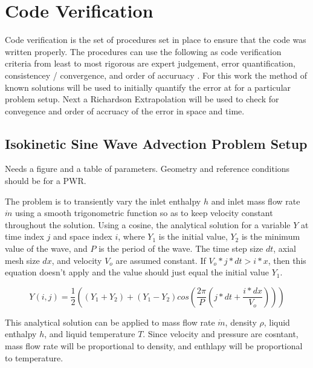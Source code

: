 \documentclass{mc2015}
\begin{document}
\section{Code Verification}

Code verification is the set of procedures set in place to ensure that the code
was written properly. The procedures can use the following as code verification
criteria from least to most rigorous are expert judgement, error quantification,
consistencey / convergence, and order of accuruacy \cite{VV_Book}. For this work
the method of known solutions will be used to initially quantify the error at
for a particular problem setup. Next a Richardson Extrapolation will be used to
check for convegence and order of accruacy of the error in space and time.
 



\subsection{Isokinetic Sine Wave Advection Problem Setup}

Needs a figure and a table of parameters. Geometry and reference conditions
should be for a PWR.

The problem is to transiently vary the inlet enthalpy $h$ and inlet mass flow
rate $\dot{m}$ using a smooth trigonometric function so as to keep velocity
constant throughout the solution. Using a cosine, the analytical solution for a
variable $Y$ at time index $j$ and space index $i$, where $Y_{1}$ is the initial
value, $Y_{2}$ is the minimum value of the wave, and $P$ is the period of the
wave. The time step size $dt$, axial mesh size $dx$, and velocity $V_{o}$ are
assumed constant. If $V_{o}*j*dt>i*x$, then this equation doesn't apply and the
value should just equal the initial value $Y_{1}$.

\begin{equation}
	Y(i,j) = \frac{1}{2} \left( 
			(Y_{1}+Y_{2}) + (Y_{1}-Y_{2}) cos\left(
				\frac{2 \pi}{P} \left( j*dt + \frac{i*dx}{V_{o}} \right)
				\right)
			\right)
\end{equation}

This analytical solution can be applied to mass flow rate $\dot{m}$,
density $\rho$, liquid enthalpy $h$, and liquid temperature $T$. Since velocity
and pressure are cosntant, mass flow rate will be proportional to density, and
enthlapy will be proportional to temperature.
\end{document}
